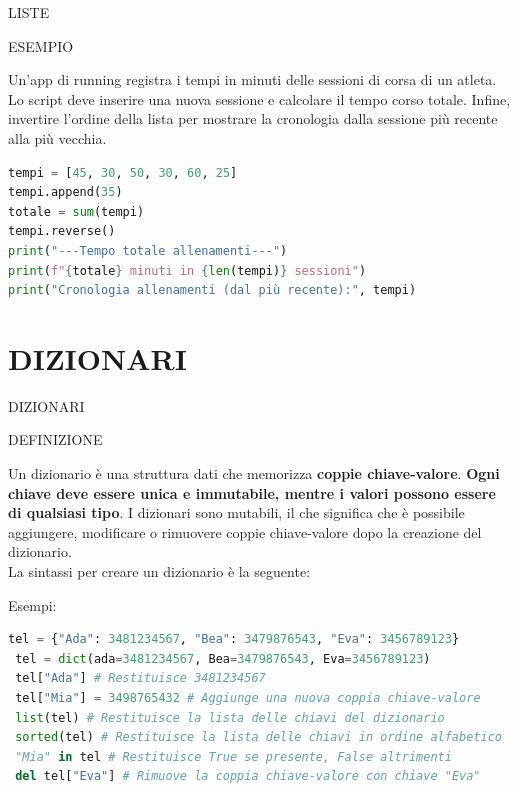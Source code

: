 \documentclass[aspectratio=1610]{beamer}
\begin{document}
\begin{frame}[fragile]{LISTE}
    \begin{alertblock}{ESEMPIO}
        \begin{minipage}{0.98\linewidth}
            Un'app di running registra i tempi in minuti delle sessioni di corsa di un atleta. 
            Lo script deve inserire una nuova sessione e calcolare il tempo corso totale.
            Infine, invertire l'ordine della lista per mostrare la cronologia dalla sessione 
            più recente alla più vecchia.
\begin{lstlisting}[language=Python]
tempi = [45, 30, 50, 30, 60, 25]
tempi.append(35)
totale = sum(tempi)
tempi.reverse()
print("---Tempo totale allenamenti---")
print(f"{totale} minuti in {len(tempi)} sessioni")
print("Cronologia allenamenti (dal più recente):", tempi)
\end{lstlisting}
        \end{minipage}
    \end{alertblock}
\end{frame}

\section{DIZIONARI}

\begin{frame}[fragile]{DIZIONARI}
    \begin{alertblock}{DEFINIZIONE}
        \begin{minipage}{0.98\linewidth}
            \justifying
            Un dizionario è una struttura dati che memorizza \textbf{coppie chiave-valore}. 
            \textbf{Ogni chiave deve essere unica e immutabile, mentre i valori possono essere 
            di qualsiasi tipo}. I dizionari sono mutabili, il che significa che è possibile 
            aggiungere, modificare o rimuovere coppie chiave-valore dopo la creazione del dizionario.\\
            La sintassi per creare un dizionario è la seguente:
            \\
            \pause
            \raggedright
            Esempi:
\begin{lstlisting}[language=Python]
 tel = {"Ada": 3481234567, "Bea": 3479876543, "Eva": 3456789123}
 tel = dict(ada=3481234567, Bea=3479876543, Eva=3456789123)
 tel["Ada"] # Restituisce 3481234567
 tel["Mia"] = 3498765432 # Aggiunge una nuova coppia chiave-valore
 list(tel) # Restituisce la lista delle chiavi del dizionario
 sorted(tel) # Restituisce la lista delle chiavi in ordine alfabetico
 "Mia" in tel # Restituisce True se presente, False altrimenti
 del tel["Eva"] # Rimuove la coppia chiave-valore con chiave "Eva"
\end{lstlisting}
        \end{minipage}
    \end{alertblock}
\end{frame}
\end{document}
